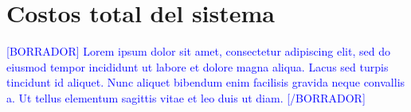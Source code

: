 \section{Costos total del sistema}

\textcolor{blue}{[BORRADOR] Lorem ipsum dolor sit amet, consectetur adipiscing elit, sed do eiusmod tempor incididunt ut labore et dolore magna aliqua. Lacus sed turpis tincidunt id aliquet. Nunc aliquet bibendum enim facilisis gravida neque convallis a. Ut tellus elementum sagittis vitae et leo duis ut diam. [/BORRADOR]} 


